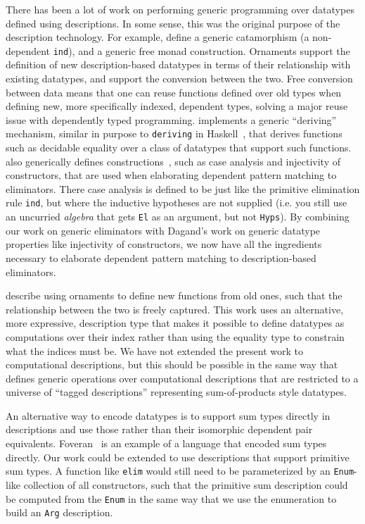 \documentclass[preprint,nonatbib]{sigplanconf}
\begin{document}
There has been a lot of work on performing generic programming over
datatypes defined using descriptions. In some sense, this was the original
purpose of the description technology. For example,
\citet{Chapman:2010:GAL:1932681.1863547} define a generic catamorphism
(a non-dependent {\tt ind}), and a generic free monad construction.
Ornaments \citep{mcbride2010ornamental} support the definition of new
description-based datatypes in terms of their relationship with
existing datatypes, and support the conversion between the two. Free
conversion between data means that one can reuse functions defined
over old types when defining new, more specifically indexed, dependent
types, solving a major reuse issue with dependently typed programming.
\citet{dagand:phd} implements a generic ``deriving'' mechanism,
similar in purpose to {\tt deriving} in
{\sc Haskell}~\citep{jones2003haskell}, that derives
functions such as decidable equality over a class of datatypes that
support such functions. \citet{dagand:phd} also generically defines
constructions~\citep{mcbride2006few}, such as case
analysis and injectivity of constructors, that are used when
elaborating dependent pattern matching to eliminators. There
case analysis is defined to be just like the primitive elimination
rule {\tt ind}, but where the inductive hypotheses are not supplied
(i.e. you still use an uncurried {\it algebra} that gets {\tt El} as
an argument, but not {\tt Hyps}). By combining our work on generic
eliminators with Dagand's work on generic datatype properties like
injectivity of constructors, we now have all the ingredients necessary to
elaborate dependent pattern matching to description-based eliminators.

\citet{dagand2012transporting} describe using ornaments
to define new functions from old ones, such that the
relationship between the two is freely captured.
This work uses an alternative, more expressive, description
type that makes it possible to define datatypes as computations over
their index rather than using the equality type to constrain what the
indices must be. We have not extended the present work to
computational descriptions, but this should be possible in the same
way that \citet{dagand:phd} defines generic operations over
computational descriptions that are restricted to a universe of
``tagged descriptions'' representing sum-of-products style datatypes.

An alternative way to encode datatypes is to
support sum types directly in descriptions and use those rather than
their isomorphic dependent pair equivalents. Foveran~\citep{foveran} is
an example of a language that encoded sum types directly. Our work
could be extended to use descriptions that support primitive sum
types. A function like {\tt elim} would still need to be parameterized
by an {\tt Enum}-like collection of all constructors, such that the
primitive sum description could be computed from the {\tt Enum} in the
same way that we use the enumeration to build an {\tt Arg}
description.
\end{document}
